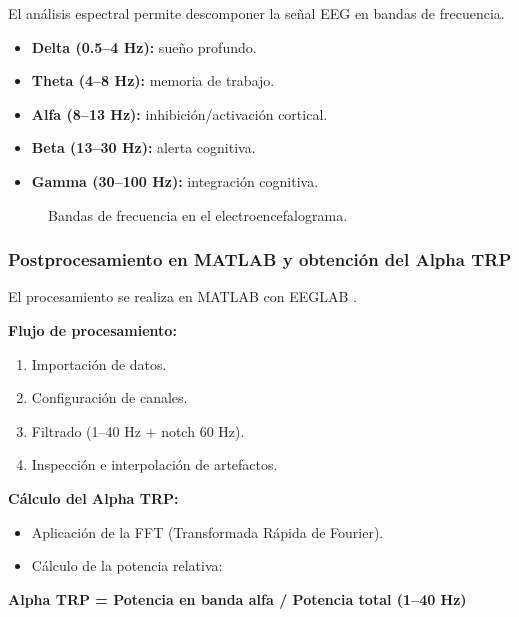 \documentclass{book}
\begin{document}
El análisis espectral permite descomponer la señal EEG en bandas de frecuencia.

\begin{itemize}
    \item \textbf{Delta (0.5--4 Hz):} sueño profundo.
    \item \textbf{Theta (4--8 Hz):} memoria de trabajo.
    \item \textbf{Alfa (8--13 Hz):} inhibición/activación cortical.
    \item \textbf{Beta (13--30 Hz):} alerta cognitiva.
    \item \textbf{Gamma (30--100 Hz):} integración cognitiva.
\end{itemize}

\begin{figure}[H]
\centering
{}
\caption{Bandas de frecuencia en el electroencefalograma.}
\label{fig:bandas_eeg}
\end{figure}

\subsubsection*{Postprocesamiento en MATLAB y obtención del Alpha TRP}

El procesamiento se realiza en MATLAB con EEGLAB \cite{Delorme2004}.

\textbf{Flujo de procesamiento:}
\begin{enumerate}
    \item Importación de datos.
    \item Configuración de canales.
    \item Filtrado (1–40 Hz + notch 60 Hz).
    \item Inspección e interpolación de artefactos.
\end{enumerate}

\textbf{Cálculo del Alpha TRP:}
\begin{itemize}
    \item Aplicación de la FFT (Transformada Rápida de Fourier).
    \item Cálculo de la potencia relativa:
\end{itemize}

\begin{center}
\textbf{Alpha TRP = Potencia en banda alfa / Potencia total (1–40 Hz)}
\end{center}
\end{document}
